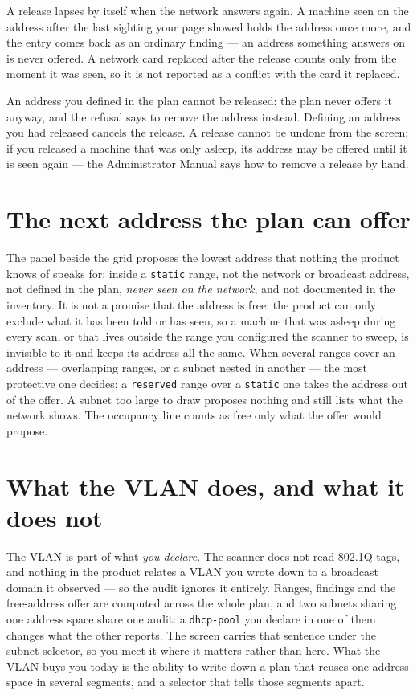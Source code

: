 \documentclass[11pt,oneside,listof=totoc,bibliography=totoc]{scrreprt}
\begin{document}
A release lapses by itself when the network answers again. A machine seen on the address after the
last sighting your page showed holds the address once more, and the entry comes back as an ordinary
finding --- an address something answers on is never offered. A network card replaced after the
release counts only from the moment it was seen, so it is not reported as a conflict with the card it
replaced.

An address you defined in the plan cannot be released: the plan never offers it anyway, and the
refusal says to remove the address instead. Defining an address you had released cancels the
release. A release cannot be undone from the screen; if you released a machine that was only asleep,
its address may be offered until it is seen again --- the Administrator Manual says how to remove a
release by hand.

\section{The next address the plan can offer}
The panel beside the grid proposes the lowest address that nothing the product knows of speaks for:
inside a \texttt{static} range, not the network or broadcast address, not defined in the plan,
\emph{never seen on the network}, and not documented in the inventory. It is not a promise that the
address is free: the product can only exclude what it has been told or has seen, so a machine that
was asleep during every scan, or that lives outside the range you configured the scanner to sweep,
is invisible to it and keeps its address all the same. When several ranges cover an address ---
overlapping ranges, or a subnet nested in another --- the most protective one decides: a
\texttt{reserved} range over a \texttt{static} one takes the address out of the offer. A subnet too
large to draw proposes nothing and still lists what the network shows. The occupancy line counts as
free only what the offer would propose.

\section{What the VLAN does, and what it does not}
The VLAN is part of what \emph{you declare}. The scanner does not read 802.1Q tags, and nothing in
the product relates a VLAN you wrote down to a broadcast domain it observed --- so the audit ignores
it entirely. Ranges, findings and the free-address offer are computed across the whole plan, and two
subnets sharing one address space share one audit: a \texttt{dhcp-pool} you declare in one of them
changes what the other reports. The screen carries that sentence under the subnet selector, so you
meet it where it matters rather than here. What the VLAN buys you today is the ability to write down
a plan that reuses one address space in several segments, and a selector that tells those segments
apart.
\end{document}
